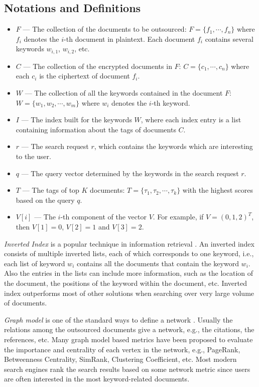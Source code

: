 \documentclass{IEEEtran}
\begin{document}
\subsection{Notations and Definitions}
\label{sec:prelim}
\begin{itemize}
\item $F$ \---- The collection of the documents to be outsourced: $F = \{f_1, \cdots, f_n\}$ where $f_i$ denotes the $i$-th document in plaintext. Each document $f_i$ contains several keywords $w_{i,1}$, $w_{i,2}$, etc.
\item $C$ \---- The collection of the encrypted documents in $F$: $C = \{c_1, \cdots, c_n\}$ where each $c_i$ is the ciphertext of document $f_i$.
\item $W$ \---- The collection of all the keywords contained in the document $F$: $W = \{w_1, w_2, \cdots, w_m\}$ where $w_i$ denotes the $i$-th keyword.
\item $I$ \---- The index built for the keywords $W$, where each index entry is a list containing information about the tags of documents $C$.
\item $r$ \---- The search request $r$, which contains the keywords which are interesting to the user.
\item $q$ \---- The query vector determined by the keywords in the search request $r$.
\item $T$ \---- The tags of top $K$ documents: $T = \{\tau_1, \tau_2, \cdots, \tau_k\}$ with the highest scores based on the query $q$.
\item $V[i]$ \---- The $i$-th component of the vector $V$. For example, if $V = (0,1,2)^T$, then $V[1] = 0$, $V[2] = 1$ and $V[3] = 2$.
\end{itemize}

\emph{Inverted Index} is a popular technique in information retrieval \cite{TAOCPv1}. An inverted index consists of multiple inverted lists, each of which corresponds to one keyword, i.e., each list of keyword $w_i$ contains all the documents that contain the keyword $w_i$. Also the entries in the lists can include more information, such as the location of the document, the positions of the keyword within the document, etc. Inverted index outperforms most of other solutions when searching over very large volume of documents.

\emph{Graph model} is one of the standard ways to define a network \cite{NM10}. Usually the relations among the outsourced documents give a network, e.g., the citations, the references, etc. Many graph model based metrics have been proposed to evaluate the importance and centrality of each vertex in the network, e.g., PageRank, Betweenness Centrality, SimRank, Clustering Coefficient, etc. Most modern search engines rank the search results based on some network metric since users are often interested in the most keyword-related documents.
\end{document}
